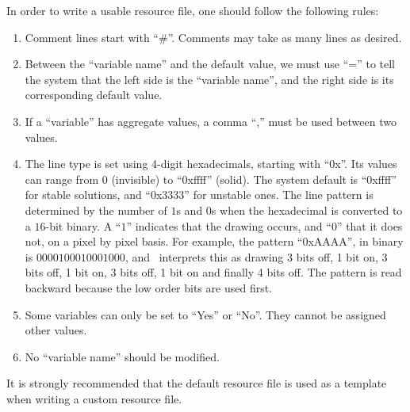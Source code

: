 In order to write a usable resource file, one should follow the following rules:
\begin{enumerate}
\item Comment lines start with ``\#''. Comments may take as many lines as desired.
\item Between the ``variable name'' and the default value, we must use
``='' to tell the system that the left side is the ``variable name'', and
the right side is its corresponding default value.
\item If a ``variable'' has aggregate values, a comma ``,'' must be used between
two values.
\item The line type is set using 4-digit hexadecimals, starting with ``0x''. Its values can
range from $0$ (invisible) to ``0xffff'' (solid). The system default is ``0xffff'' for stable
solutions, and ``0x3333'' for unstable ones.
The line pattern is determined by the number of $1$s and $0$s when the hexadecimal
is converted to a $16$-bit binary. A ``$1$'' indicates that the drawing occurs, and ``$0$'' that
it does not, on a pixel by pixel basis. For example, the pattern ``0xAAAA'',
in binary is $0000100010001000$, and \PLAUT~interprets this as drawing
3 bits off, 1 bit on, 3 bits off, 1 bit on, 3 bits off, 1 bit on and finally 4 bits off.
The pattern is read backward because the low order bits are used first.
\item Some variables can only be set to ``Yes'' or ``No''. They cannot be assigned other values.
\item No ``variable name'' should be  modified.
\end{enumerate}

It is strongly recommended that the default resource file is used as a template
when writing a custom resource file.

